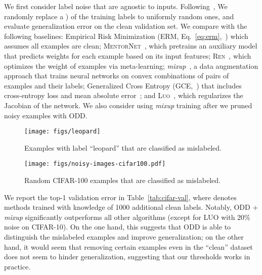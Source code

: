 \documentclass[a4paper,11pt]{article}
\begin{document}
We first consider label noise that are agnostic to inputs. 
Following~\cite{zhang2016understanding}, We randomly replace a ) of the training labels to uniformly random ones, and evaluate generalization error on the clean validation set.
We compare with the following baselines: Empirical Risk Minimization (\textsc{ERM}, Eq.~\ref{eq:erm},~\cite{goyal2017accurate}) which assumes all examples are clean; \textsc{MentorNet}~\cite{jiang2017mentornet}, which pretrains an auxiliary model that predicts weights for each example based on its input features; \textsc{Ren}~\cite{ren2018learning}, which optimizes the weight of examples via meta-learning; \textit{mixup}~\cite{zhang2017mixup}, a data augmentation approach that trains neural networks on convex combinations of pairs of examples and their labels; Generalized Cross Entropy (\textsc{GCE},~\cite{zhang2018generalized}) that includes cross-entropy loss and mean absolute error~\cite{ghosh2017robust}; and \textsc{Luo}~\cite{luo2019simple}, which regularizes the Jacobian of the network. We also consider using \textit{mixup} training after we pruned noisy examples with \textsc{ODD}. 

\begin{figure*}[tbp]
    \centering
    \texttt{[image: figs/leopard]}
    \caption{Examples with label ``leopard'' that are classified as mislabeled.}
    \label{fig:leopard}
\end{figure*}




\begin{figure*}[tbp]
    \centering
    \texttt{[image: figs/noisy-images-cifar100.pdf]}
    \caption{Random CIFAR-100 examples that are classified as mislabeled.}
    \label{fig:noisy-images-cifar100-t}
\end{figure*}












We report the top-1 validation error in Table~\ref{tab:cifar-val}, where  denotes methods trained with knowledge of 1000 additional clean labels. Notably, \textsc{ODD} + \textit{mixup} significantly outperforms all other algorithms (except for \textsc{LUO} with 20\% noise on CIFAR-10). On the one hand, this suggests that \textsc{ODD} is able to distinguish the mislabeled examples and improve generalization; on the other hand, it would seem that removing certain examples even in the ``clean'' dataset does not seem to hinder generalization, suggesting that our thresholds works in practice.
\end{document}
